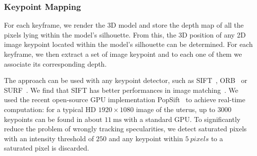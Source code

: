 \subsubsection{Keypoint Mapping}
\label{sec:preparing}
For each keyframe, we render the 3D model and store the depth map of all the pixels lying within the model's silhouette. %
From this, the 3D position  of any 2D image keypoint located within the model's silhouette can be determined.
For each keyframe, we then extract a set of image keypoint and to each one of them we associate its corresponding depth. 

The approach can be used with any keypoint detector, such as SIFT~\cite{Lowe:2004:DIF:993451.996342}, ORB~\cite{orbslam_laparo} or SURF~\cite{SURF}.
We find that SIFT has better performances in image matching~\cite{Tuytelaars2007}.
We used the recent open-source GPU implementation PopSift~\cite{Griwodz2018Popsift} to achieve real-time computation: for a typical HD $1920\times1080$ image of the uterus, up to $3000$ keypoints can be found in about $\SI{11}{\milli\second}$ with a standard GPU.
To significantly reduce the problem of wrongly tracking specularities, we detect saturated pixels with an intensity threshold of $250$ and any keypoint within $\SI{5}{pixels}$ to a saturated pixel is discarded.  

